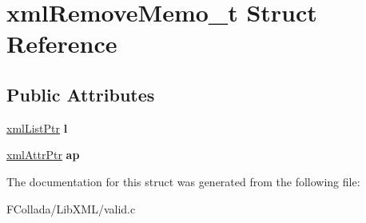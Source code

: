 \hypertarget{structxmlRemoveMemo__t}{
\section{xmlRemoveMemo\_\-t Struct Reference}
\label{structxmlRemoveMemo__t}
}
\subsection*{Public Attributes}
\begin{DoxyCompactItemize}
\item 
\hypertarget{structxmlRemoveMemo__t_a9cc6507efe7d2f04b07433f500fcad28}{
\hyperlink{struct__xmlList}{xmlListPtr} {\bfseries l}}
\label{structxmlRemoveMemo__t_a9cc6507efe7d2f04b07433f500fcad28}

\item 
\hypertarget{structxmlRemoveMemo__t_aea85ba9f1f0ced6b6a544ba95f5e2a36}{
\hyperlink{struct__xmlAttr}{xmlAttrPtr} {\bfseries ap}}
\label{structxmlRemoveMemo__t_aea85ba9f1f0ced6b6a544ba95f5e2a36}

\end{DoxyCompactItemize}


The documentation for this struct was generated from the following file:\begin{DoxyCompactItemize}
\item 
FCollada/LibXML/valid.c\end{DoxyCompactItemize}
